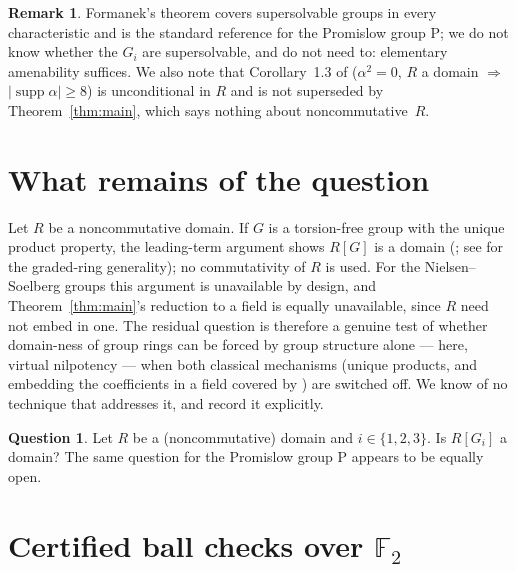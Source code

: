 \documentclass[11pt]{amsart}
\theoremstyle{definition}
\newtheorem{question}[theorem]{Question}
\newtheorem{remark}[theorem]{Remark}
\renewcommand{\P}{\mathrm{P}}
\newcommand{\F}{\mathbb{F}}
\begin{document}
\begin{remark}
Formanek's theorem \cite{Formanek} covers supersolvable groups in every
characteristic and is the standard reference for the Promislow group $\P$;
we do not know whether the $G_i$ are supersolvable, and do not need to:
elementary amenability suffices. We also note that
Corollary~1.3 of \cite{NS} ($\alpha^2=0$, $R$ a domain $\Rightarrow$
$|\operatorname{supp}\alpha|\ge 8$) is unconditional in $R$ and is not
superseded by Theorem~\ref{thm:main}, which says nothing about
noncommutative~$R$.
\end{remark}

\section{What remains of the question}\label{sec:noncomm}

Let $R$ be a noncommutative domain. If $G$ is a torsion-free group with the
unique product property, the leading-term argument shows $R[G]$ is a domain
(\cite{Strojnowski}; see \cite[Theorem 3.4]{Oinert} for the graded-ring
generality); no commutativity of $R$ is used. For the Nielsen--Soelberg
groups this argument is unavailable by design, and Theorem~\ref{thm:main}'s
reduction to a field is equally unavailable, since $R$ need not embed in
one. The residual question is therefore a genuine test of whether
domain-ness of group rings can be forced by group structure alone --- here,
virtual nilpotency --- when both classical mechanisms (unique products, and
embedding the coefficients in a field covered by \cite{KLM}) are switched
off. We know of no technique that addresses it, and record it explicitly.

\begin{question}\label{q:noncomm}
Let $R$ be a (noncommutative) domain and $i\in\{1,2,3\}$. Is $R[G_i]$ a
domain? The same question for the Promislow group $\P$ appears to be
equally open.
\end{question}

\section{Certified ball checks over \texorpdfstring{$\F_2$}{F2}}
\label{sec:certs}
\end{document}
